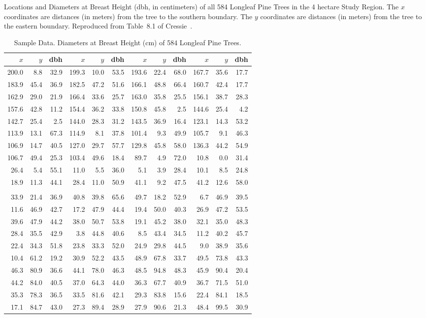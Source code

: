 \documentclass[draft]{article}
\begin{document}
\clearpage

\begin{table}
\caption{Sample Data. Diameters at Breast Height (cm)
of 584 Longleaf Pine Trees.}
\label{tbl:pine}
Locations and Diameters at Breast Height (dbh, in centimeters)
of all 584 Longleaf Pine Trees in the 4 hectare Study Region.
The \(x\) coordinates are distances (in meters) from the tree to the
southern boundary. The \(y\) coordinates are distances (in meters) from
the tree to the eastern boundary.
Reproduced from Table~8.1 of Cressie~\protect\cite{cressie91}.
\scriptsize
\begin{center}
\begin{tabular}{rrrrrrrrrrrr}
\hline
\(x\)&\(y\)& dbh &\(x\)&\(y\)& dbh &\(x\)&\(y\)& dbh &\(x\)&\(y\)& dbh \\
\hline
200.0&  8.8& 32.9&199.3& 10.0& 53.5&193.6& 22.4& 68.0&167.7& 35.6& 17.7\\
183.9& 45.4& 36.9&182.5& 47.2& 51.6&166.1& 48.8& 66.4&160.7& 42.4& 17.7\\
162.9& 29.0& 21.9&166.4& 33.6& 25.7&163.0& 35.8& 25.5&156.1& 38.7& 28.3\\
157.6& 42.8& 11.2&154.4& 36.2& 33.8&150.8& 45.8&  2.5&144.6& 25.4&  4.2\\
142.7& 25.4&  2.5&144.0& 28.3& 31.2&143.5& 36.9& 16.4&123.1& 14.3& 53.2\\
113.9& 13.1& 67.3&114.9&  8.1& 37.8&101.4&  9.3& 49.9&105.7&  9.1& 46.3\\
106.9& 14.7& 40.5&127.0& 29.7& 57.7&129.8& 45.8& 58.0&136.3& 44.2& 54.9\\
106.7& 49.4& 25.3&103.4& 49.6& 18.4& 89.7&  4.9& 72.0& 10.8&  0.0& 31.4\\
 26.4&  5.4& 55.1& 11.0&  5.5& 36.0&  5.1&  3.9& 28.4& 10.1&  8.5& 24.8\\
 18.9& 11.3& 44.1& 28.4& 11.0& 50.9& 41.1&  9.2& 47.5& 41.2& 12.6& 58.0\\
\\
 33.9& 21.4& 36.9& 40.8& 39.8& 65.6& 49.7& 18.2& 52.9&  6.7& 46.9& 39.5\\
 11.6& 46.9& 42.7& 17.2& 47.9& 44.4& 19.4& 50.0& 40.3& 26.9& 47.2& 53.5\\
 39.6& 47.9& 44.2& 38.0& 50.7& 53.8& 19.1& 45.2& 38.0& 32.1& 35.0& 48.3\\
 28.4& 35.5& 42.9&  3.8& 44.8& 40.6&  8.5& 43.4& 34.5& 11.2& 40.2& 45.7\\
 22.4& 34.3& 51.8& 23.8& 33.3& 52.0& 24.9& 29.8& 44.5&  9.0& 38.9& 35.6\\
 10.4& 61.2& 19.2& 30.9& 52.2& 43.5& 48.9& 67.8& 33.7& 49.5& 73.8& 43.3\\
 46.3& 80.9& 36.6& 44.1& 78.0& 46.3& 48.5& 94.8& 48.3& 45.9& 90.4& 20.4\\
 44.2& 84.0& 40.5& 37.0& 64.3& 44.0& 36.3& 67.7& 40.9& 36.7& 71.5& 51.0\\
 35.3& 78.3& 36.5& 33.5& 81.6& 42.1& 29.3& 83.8& 15.6& 22.4& 84.1& 18.5\\
 17.1& 84.7& 43.0& 27.3& 89.4& 28.9& 27.9& 90.6& 21.3& 48.4& 99.5& 30.9\\


\end{tabular}
\end{center}
\end{table}
\end{document}
